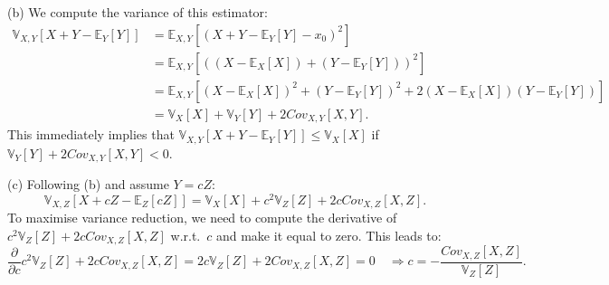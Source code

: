 (b) We compute the variance of this estimator:
\begin{equation*}
\begin{aligned}
\mathbb{V}_{X, Y}[ X + Y - \mathbb{E}_Y[Y] ] &= \mathbb{E}_{X, Y}[(X + Y - \mathbb{E}_Y[Y] - x_0 )^2] \\
&= \mathbb{E}_{X, Y}[( (X - \mathbb{E}_X[X]) + (Y - \mathbb{E}_Y[Y]) )^2] \\
&= \mathbb{E}_{X, Y}[(X - \mathbb{E}_X[X])^2 + (Y - \mathbb{E}_Y[Y])^2 + 2 (X - \mathbb{E}_X[X]) (Y - \mathbb{E}_Y[Y])] \\
&= \mathbb{V}_{X}[X] + \mathbb{V}_{Y}[Y] + 2 Cov_{X, Y}[X, Y].
\end{aligned}
\end{equation*}
This immediately implies that $\mathbb{V}_{X, Y}[ X + Y - \mathbb{E}_Y[Y] ] \leq \mathbb{V}_{X}[X]$ if $\mathbb{V}_{Y}[Y] + 2 Cov_{X, Y}[X, Y] < 0$.

(c) Following (b) and assume $Y = c Z$:
\begin{equation*}
\mathbb{V}_{X, Z}[ X + c Z - \mathbb{E}_Z[c Z] ] = \mathbb{V}_{X}[X] + c^2 \mathbb{V}_{Z}[Z] + 2c Cov_{X, Z}[X, Z].
\end{equation*}
To maximise variance reduction, we need to compute the derivative of $c^2 \mathbb{V}_{Z}[Z] + 2c Cov_{X, Z}[X, Z]$ w.r.t.~$c$ and make it equal to zero. This leads to:
$$ \frac{\partial}{\partial c} c^2 \mathbb{V}_{Z}[Z] + 2c Cov_{X, Z}[X, Z] = 2c \mathbb{V}_{Z}[Z] + 2 Cov_{X, Z}[X, Z] = 0 \quad \Rightarrow c = - \frac{Cov_{X, Z}[X, Z]}{\mathbb{V}_{Z}[Z]}.$$


